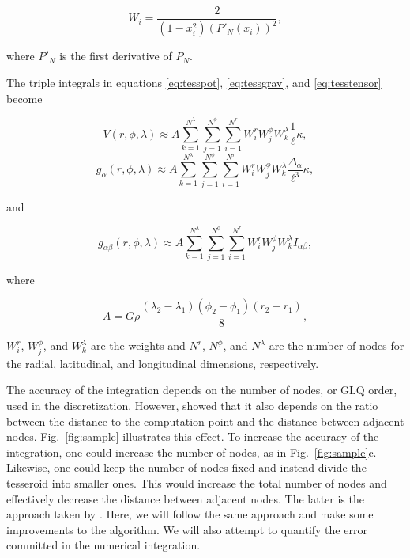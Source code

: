 \begin{equation}
    W_i = \frac{2}{(1 - x_i^2)(P'_N(x_i))^2},
\end{equation}

\noindent
where $P'_N$ is the first derivative of $P_N$.

The triple integrals in equations
\ref{eq:tesspot},
\ref{eq:tessgrav},
and
\ref{eq:tesstensor}
become

\begin{equation}
    V(r,\phi,\lambda) \approx
        A
        \sum\limits_{k=1}^{N^{\lambda}}
        \sum\limits_{j=1}^{N^{\phi}}
        \sum\limits_{i=1}^{N^r}
        W^r_i W^{\phi}_j W^{\lambda}_k
        \frac{1}{\ell} \kappa,
\end{equation}
\begin{equation}
    g_{\alpha}(r,\phi,\lambda) \approx
        A
        \sum\limits_{k=1}^{N^{\lambda}}
        \sum\limits_{j=1}^{N^{\phi}}
        \sum\limits_{i=1}^{N^r}
        W^r_i W^{\phi}_j W^{\lambda}_k
        \frac{\Delta_{\alpha}}{\ell^3} \kappa,
\end{equation}

\noindent
and

\begin{equation}
    g_{\alpha\beta}(r,\phi,\lambda) \approx
        A
        \sum\limits_{k=1}^{N^{\lambda}}
        \sum\limits_{j=1}^{N^{\phi}}
        \sum\limits_{i=1}^{N^r}
        W^r_i W^{\phi}_j W^{\lambda}_k
        I_{\alpha\beta},
\end{equation}

\noindent
where

\begin{equation}
    A = G \rho
    \frac{(\lambda_2 - \lambda_1)(\phi_2 - \phi_1)(r_2 - r_1)}{8},
\end{equation}

\noindent
$W_i^r$, $W_j^{\phi}$, and $W_k^{\lambda}$
are the weights
and $N^r$, $N^{\phi}$, and $N^{\lambda}$
are the number of nodes
for the radial, latitudinal, and longitudinal dimensions, respectively.

The accuracy of the integration
depends on the number of nodes, or GLQ order,
used in the discretization.
However, \citet{Ku1977} showed
that it also depends on the ratio between
the distance to the computation point
and the distance between adjacent nodes.
Fig.~\ref{fig:sample}
illustrates this effect.
To increase the accuracy of the integration,
one could increase the number of nodes,
as in Fig.~\ref{fig:sample}c.
Likewise,
one could keep the number of nodes fixed
and instead divide the tesseroid into smaller ones.
This would increase the total number of nodes
and effectively decrease
the distance between adjacent nodes.
The latter is the approach
taken by \citet{Li2011}.
Here, we will follow the same approach
and make some improvements to the algorithm.
We will also attempt to quantify
the error committed in the numerical integration.

